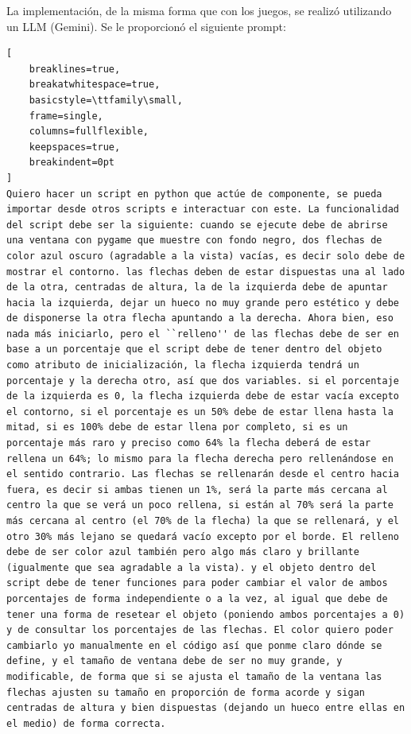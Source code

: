 La implementación, de la misma forma que con los juegos, se realizó utilizando un LLM (Gemini). Se le proporcionó el siguiente prompt:

\begingroup %

\emergencystretch=0pt

\begin{lstlisting}[
    breaklines=true,
    breakatwhitespace=true,
    basicstyle=\ttfamily\small,
    frame=single,
    columns=fullflexible,
    keepspaces=true,
    breakindent=0pt
]
Quiero hacer un script en python que actúe de componente, se pueda importar desde otros scripts e interactuar con este. La funcionalidad del script debe ser la siguiente: cuando se ejecute debe de abrirse una ventana con pygame que muestre con fondo negro, dos flechas de color azul oscuro (agradable a la vista) vacías, es decir solo debe de mostrar el contorno. las flechas deben de estar dispuestas una al lado de la otra, centradas de altura, la de la izquierda debe de apuntar hacia la izquierda, dejar un hueco no muy grande pero estético y debe de disponerse la otra flecha apuntando a la derecha. Ahora bien, eso nada más iniciarlo, pero el ``relleno'' de las flechas debe de ser en base a un porcentaje que el script debe de tener dentro del objeto como atributo de inicialización, la flecha izquierda tendrá un porcentaje y la derecha otro, así que dos variables. si el porcentaje de la izquierda es 0, la flecha izquierda debe de estar vacía excepto el contorno, si el porcentaje es un 50% debe de estar llena hasta la mitad, si es 100% debe de estar llena por completo, si es un porcentaje más raro y preciso como 64% la flecha deberá de estar rellena un 64%; lo mismo para la flecha derecha pero rellenándose en el sentido contrario. Las flechas se rellenarán desde el centro hacia fuera, es decir si ambas tienen un 1%, será la parte más cercana al centro la que se verá un poco rellena, si están al 70% será la parte más cercana al centro (el 70% de la flecha) la que se rellenará, y el otro 30% más lejano se quedará vacío excepto por el borde. El relleno debe de ser color azul también pero algo más claro y brillante (igualmente que sea agradable a la vista). y el objeto dentro del script debe de tener funciones para poder cambiar el valor de ambos porcentajes de forma independiente o a la vez, al igual que debe de tener una forma de resetear el objeto (poniendo ambos porcentajes a 0) y de consultar los porcentajes de las flechas. El color quiero poder cambiarlo yo manualmente en el código así que ponme claro dónde se define, y el tamaño de ventana debe de ser no muy grande, y modificable, de forma que si se ajusta el tamaño de la ventana las flechas ajusten su tamaño en proporción de forma acorde y sigan centradas de altura y bien dispuestas (dejando un hueco entre ellas en el medio) de forma correcta.
\end{lstlisting}

